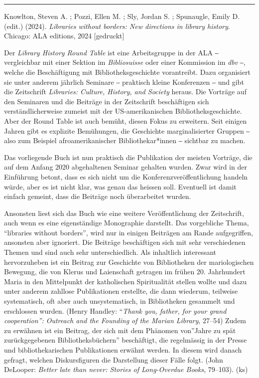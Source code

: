 \documentclass[a4paper,
fontsize=11pt,
oneside,
numbers=noperiodatend,
parskip=half-,
bibliography=totoc,
final
]{scrartcl}
\begin{document}
\begin{center}\rule{0.5\linewidth}{0.5pt}\end{center}

Knowlton, Steven A. ; Pozzi, Ellen M. ; Sly, Jordan S. ; Spunaugle,
Emily D. (edit.) (2024). \emph{Libraries without borders: New directions
in library history}. Chicago: ALA editions, 2024 {[}gedruckt{]}

Der \emph{Library History Round Table} ist eine Arbeitsgruppe in der ALA
‒ vergleichbar mit einer Sektion im \emph{Bibliosuisse} oder einer
Kommission im \emph{dbv} ‒, welche die Beschäftigung mit
Bibliotheksgeschichte vorantreibt. Dazu organisiert sie unter anderem
jährlich Seminare ‒ praktisch kleine Konferenzen ‒ und gibt die
Zeitschrift \emph{Libraries: Culture, History, and Society} heraus. Die
Vorträge auf den Seminaren und die Beiträge in der Zeitschrift
beschäftigen sich verständlicherweise zumeist mit der US-amerikanischen
Bibliotheksgeschichte. Aber der Round Table ist auch bemüht, diesen
Fokus zu erweitern. Seit einigen Jahren gibt es explizite Bemühungen,
die Geschichte marginalisierter Gruppen ‒ also zum Beispiel
afroamerikanischer Bibliothekar*innen ‒ sichtbar zu machen.

Das vorliegende Buch ist nun praktisch die Publikation der meisten
Vorträge, die auf dem Anfang 2020 abgehaltenen Seminar gehalten wurden.
Zwar wird in der Einführung betont, dass es sich nicht um die
Konferenzveröffentlichung handeln würde, aber es ist nicht klar, was
genau das heissen soll. Eventuell ist damit einfach gemeint, dass die
Beiträge noch überarbeitet wurden.

Ansonsten liest sich das Buch wie eine weitere Veröffentlichung der
Zeitschrift, auch wenn es eine eigenständige Monographie darstellt. Das
vorgebliche Thema, \enquote{libraries without borders}, wird nur in
einigen Beiträgen am Rande aufgegriffen, ansonsten aber ignoriert. Die
Beiträge beschäftigen sich mit sehr verschiedenen Themen und sind auch
sehr unterschiedlich. Als inhaltlich interessant hervorzuheben ist ein
Beitrag zur Geschichte von Bibliotheken der mariologischen Bewegung, die
von Klerus und Laienschaft getragen im frühen 20. Jahrhundert Maria in
den Mittelpunkt der katholischen Spiritualität stellen wollte und dazu
unter anderem zahllose Publikationen erstellte, die dann wiederum,
teilweise systematisch, oft aber auch unsystematisch, in Bibliotheken
gesammelt und erschlossen wurden. (Henry Handley: \enquote{\emph{Thank
you, father, for your grand cooperation'': Outreach and the Founding of
the Marian Library}, 27--54) Zudem zu erwähnen ist ein Beitrag, der sich
mit dem Phänomen von}Jahre zu spät zurückgegebenen Bibliotheksbüchern''
beschäftigt, die regelmässig in der Presse und bibliothekarischen
Publikationen erwähnt werden. In diesem wird danach gefragt, welchen
Diskursfiguren die Darstellung dieser Fälle folgt. (John DeLooper:
\emph{Better late than never: Stories of Long-Overdue Books}, 79--103).
(ks)
\end{document}

